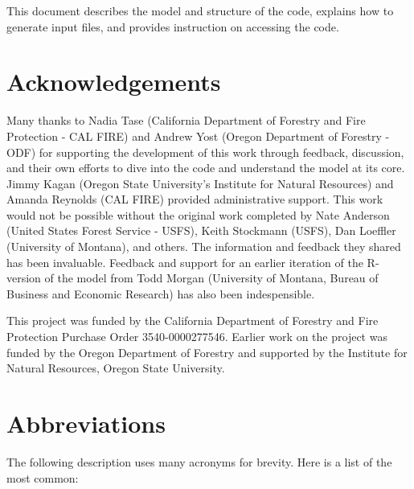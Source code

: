 \documentclass[
  openany]{book}
\begin{document}
This document describes the model and structure of the code, explains
how to generate input files, and provides instruction on accessing the
code.

\hypertarget{sum-ack}{%
\section{Acknowledgements}\label{sum-ack}}

Many thanks to Nadia Tase (California Department of Forestry and Fire
Protection - CAL FIRE) and Andrew Yost (Oregon Department of Forestry -
ODF) for supporting the development of this work through feedback,
discussion, and their own efforts to dive into the code and understand
the model at its core. Jimmy Kagan (Oregon State University's Institute
for Natural Resources) and Amanda Reynolds (CAL FIRE) provided
administrative support. This work would not be possible without the
original work completed by Nate Anderson (United States Forest Service -
USFS), Keith Stockmann (USFS), Dan Loeffler (University of Montana), and
others. The information and feedback they shared has been invaluable.
Feedback and support for an earlier iteration of the R-version of the
model from Todd Morgan (University of Montana, Bureau of Business and
Economic Research) has also been indespensible.

This project was funded by the California Department of Forestry and
Fire Protection Purchase Order 3540-0000277546. Earlier work on the
project was funded by the Oregon Department of Forestry and supported by
the Institute for Natural Resources, Oregon State University.

\hypertarget{sum-abb}{%
\section{Abbreviations}\label{sum-abb}}

The following description uses many acronyms for brevity. Here is a list
of the most common:
\end{document}
